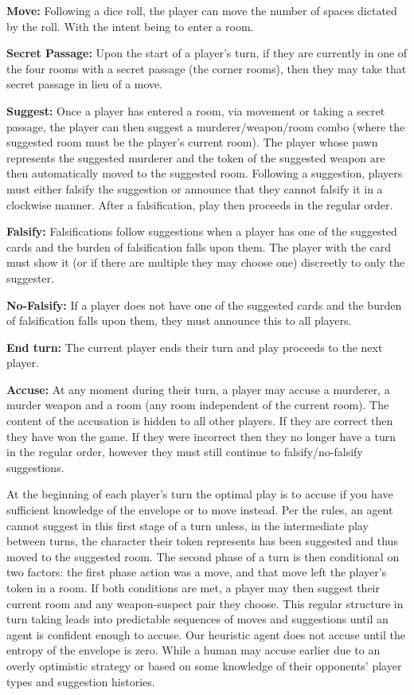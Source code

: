 \documentclass[msc, deptreport, ai, romanprepages]{infthesis}
\begin{document}
\begin{description}
\item \textbf{Move:} Following a dice roll, the player can move the number of spaces dictated by the roll. With the intent being to enter a room.
\item \textbf{Secret Passage:} Upon the start of a player’s turn, if they are currently in one of the four rooms with a secret passage (the corner rooms), then they may take that secret passage in lieu of a move.
\item \textbf{Suggest:} Once a player has entered a room, via movement or taking a secret passage, the player can then suggest a murderer/weapon/room combo (where the suggested room must be the player’s current room). The player whose pawn represents the suggested murderer and the token of the suggested weapon are then automatically moved to the suggested room. Following a suggestion, players must either falsify the suggestion or announce that they cannot falsify it in a clockwise manner. After a falsification, play then proceeds in the regular order.
\item \textbf{Falsify:} Falsifications follow suggestions when a player has one of the suggested cards and the burden of falsification falls upon them. The player with the card must show it (or if there are multiple they may choose one) discreetly to only the suggester.
\item \textbf{No-Falsify:} If a player does not have one of the suggested cards and the burden of falsification falls upon them, they must announce this to all players.
\item \textbf{End turn:} The current player ends their turn and play proceeds to the next player.
\item \textbf{Accuse:} At any moment during their turn, a player may accuse a murderer, a murder weapon and a room (any room independent of the current room). The content of the accusation is hidden to all other players. If they are correct then they have won the game. If they were incorrect then they no longer have a turn in the regular order, however they must still continue to falsify/no-falsify suggestions.
\end{description}

At the beginning of each player’s turn the optimal play is to accuse if you have sufficient knowledge of the envelope or to move instead. Per the rules, an agent cannot suggest in this first stage of a turn unless, in the intermediate play between turns, the character their token represents has been suggested and thus moved to the suggested room. The second phase of a turn is then conditional on two factors: the first phase action was a move, and that move left the player’s token in a room. If both conditions are met, a player may then suggest their current room and any weapon-suspect pair they choose. This regular structure in turn taking leads into predictable sequences of moves and suggestions until an agent is confident enough to accuse. Our heuristic agent does not accuse until the entropy of the envelope is zero. While a human may accuse earlier due to an overly optimistic strategy or based on some knowledge of their opponents’ player types and suggestion histories. 
\end{document}
